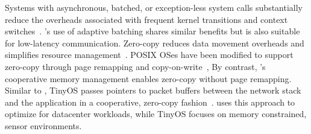  Systems with
asynchronous, batched, or exception-less system calls substantially
reduce the overheads associated with frequent kernel transitions and
context
switches~\cite{DBLP:conf/osdi/HanMCR12,jeong2014mtcp,DBLP:journals/cacm/Rizzo12,DBLP:conf/osdi/SoaresS10}. \ix's
use of adaptive batching shares similar benefits but is also suitable
for low-latency communication.  Zero-copy reduces data movement
overheads and simplifies resource
management~\cite{DBLP:journals/tocs/PaiDZ00}. POSIX OSes have been
modified to support zero-copy through page remapping and
copy-on-write~\cite{DBLP:conf/usenix/Chu96}, By contrast, \ix's
cooperative memory management enables zero-copy without page
remapping. Similar to \ix, TinyOS passes pointers to packet buffers
between the network stack and the application in a cooperative,
zero-copy fashion~\cite{tinyosnet}.
\ix uses this approach to optimize for datacenter
workloads, while TinyOS focuses on memory constrained, sensor
environments.

